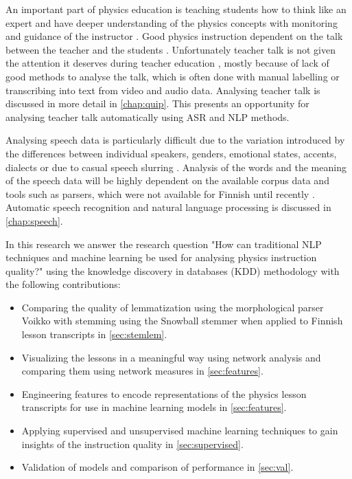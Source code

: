 \documentclass[utf8,english]{gradu3}
\begin{document}
An important part of physics education is teaching students how to think like an expert and have deeper understanding of the physics concepts with monitoring and guidance of the instructor \parencite{wiemanTransformingPhysicsEducation2007}. Good physics instruction dependent on the talk between the teacher and the students \parencite{scottTeachingScienceMeaningful2007}. Unfortunately teacher talk is not given the attention it deserves during teacher education \parencite{crespoPraisingCorrectingProspective2002,lehesvuoriDialogicTeachingScience2013}, mostly because of lack of good methods to analyse the talk, which is often done with manual labelling or transcribing into text from video and audio data. Analysing teacher talk is discussed in more detail in \autoref{chap:quip}. This presents an opportunity for analysing teacher talk automatically using ASR and NLP methods.

Analysing speech data is particularly difficult due to the variation introduced by the differences between individual speakers, genders, emotional states, accents, dialects or due to casual speech slurring \parencite{benzeghibaAutomaticSpeechRecognition2007}. Analysis of the words and the meaning of the speech data will be highly dependent on the available corpus data and tools such as parsers, which were not available for Finnish until recently \parencite{haverinenNaturalLanguageProcessing2014, enarviModelingConversationalFinnish2018}. Automatic speech recognition and natural language processing is discussed in \autoref{chap:speech}.

In this research we answer the research question "How can traditional NLP techniques and machine learning be used for analysing physics instruction quality?" using the knowledge discovery in databases (KDD) methodology with the following contributions:

\begin{itemize}
  \item Comparing the quality of lemmatization using the morphological parser Voikko with stemming using the Snowball stemmer when applied to Finnish lesson transcripts in \autoref{sec:stemlem}.
  \item Visualizing the lessons in a meaningful way using network analysis and comparing them using network measures in \autoref{sec:features}.
  \item Engineering features to encode representations of the physics lesson transcripts for use in machine learning models in \autoref{sec:features}. 
  \item Applying supervised and unsupervised machine learning techniques to gain insights of the instruction quality in \autoref{sec:supervised}.
  \item Validation of models and comparison of performance in \autoref{sec:val}.
\end{itemize}
\end{document}
